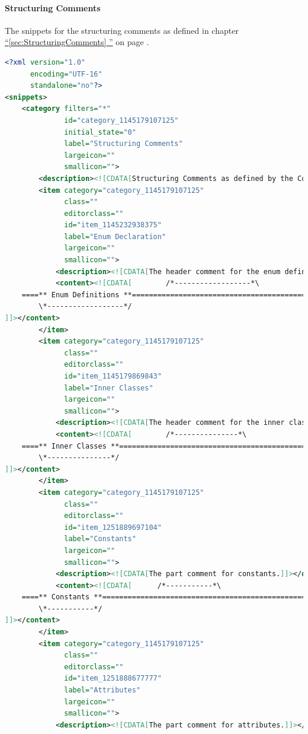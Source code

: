\documentclass[11pt,a4paper, titlepage, parskip=half, headsepline, footsepline, cleardoublepage=current, headheight=1cm]{scrbook}
\newcommand*{\tqfullvref}[1]{\hyperref[{#1}]{“\ref*{#1} \nameref*{#1}”} on page \pageref{#1}}
\begin{document}
\paragraph{Structuring Comments}\label{sec:SnippetStructuringComments}
The snippets for the structuring comments as defined in chapter \tqfullvref{sec:StructuringComments}.
\begin{lstlisting}[language=XML,basicstyle=\ttfamily\footnotesize]
<?xml version="1.0"
      encoding="UTF-16" 
      standalone="no"?>
<snippets>
    <category filters="*"
              id="category_1145179107125"
              initial_state="0"
              label="Structuring Comments"
              largeicon=""
              smallicon="">
        <description><![CDATA[Structuring Comments as defined by the Code Conventions]]></description>
        <item category="category_1145179107125"
              class=""
              editorclass=""
              id="item_1145232938375"
              label="Enum Declaration"
              largeicon=""
              smallicon="">
            <description><![CDATA[The header comment for the enum definition part]]></description>
            <content><![CDATA[        /*------------------*\
    ====** Enum Definitions **=================================================
        \*------------------*/
]]></content>
        </item>
        <item category="category_1145179107125"
              class=""
              editorclass=""
              id="item_1145179869843"
              label="Inner Classes"
              largeicon=""
              smallicon="">
            <description><![CDATA[The header comment for the inner classes part]]></description>
            <content><![CDATA[        /*---------------*\
    ====** Inner Classes **====================================================
        \*---------------*/
]]></content>
        </item>
        <item category="category_1145179107125"
              class=""
              editorclass=""
              id="item_1251889697104"
              label="Constants"
              largeicon=""
              smallicon="">
            <description><![CDATA[The part comment for constants.]]></description>
            <content><![CDATA[      /*-----------*\
    ====** Constants **========================================================
        \*-----------*/
]]></content>
        </item>
        <item category="category_1145179107125"
              class=""
              editorclass=""
              id="item_1251888677777"
              label="Attributes"
              largeicon=""
              smallicon="">
            <description><![CDATA[The part comment for attributes.]]></description>

\end{lstlisting}
\end{document}

